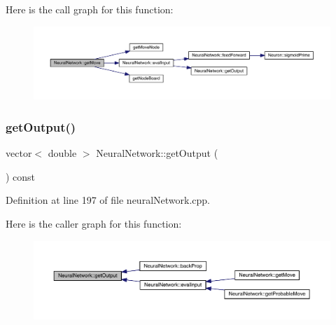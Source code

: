 Here is the call graph for this function\+:\nopagebreak
\begin{figure}[H]
\begin{center}
\leavevmode
\includegraphics[width=350pt]{class_neural_network_af773d118844a6dc42c8a4edc05652893_cgraph}
\end{center}
\end{figure}
\mbox{\label{class_neural_network_a73d030bfbf3efe8edb0bfd8a7e94ed53}} 
\subsubsection{\texorpdfstring{get\+Output()}{getOutput()}}
{\footnotesize\ttfamily vector$<$ double $>$ Neural\+Network\+::get\+Output (\begin{DoxyParamCaption}{ }\end{DoxyParamCaption}) const}



Definition at line 197 of file neural\+Network.\+cpp.

Here is the caller graph for this function\+:\nopagebreak
\begin{figure}[H]
\begin{center}
\leavevmode
\includegraphics[width=350pt]{class_neural_network_a73d030bfbf3efe8edb0bfd8a7e94ed53_icgraph}
\end{center}
\end{figure}
\mbox{\label{class_neural_network_abaeb2ec4b31b2a69985cacec5fd1d685}} 
